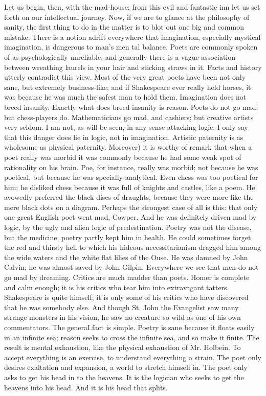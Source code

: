 \documentclass{book}
\begin{document}
Let us begin, then, with the mad-house; from this evil and fantastic inn let us set forth on our intellectual journey. Now, if we are to glance at the philosophy of sanity, the first thing to do in the matter is to blot out one big and common mistake. There is a notion adrift everywhere that imagination, especially mystical imagination, is dangerous to man’s men tal balance. Poets are commonly spoken of as psychologically unreliable; and generally there is a vague association between wreathing laurels in your hair and sticking straws in it. Facts and history utterly contradict this view. Most of the very great poets have been not only sane, but extremely business-like; and if Shakespeare ever really held horses, it was because he was much the safest man to hold them. Imagination does not breed insanity. Exactly what does breed insanity is reason. Poets do not go mad; but chess-players do. Mathematicians go mad, and cashiers; but creative artists very seldom. I am not, as will be seen, in any sense attacking logic: I only say that this danger does lie in logic, not in imagination. Artistic paternity is as wholesome as physical paternity. Moreover) it is worthy of remark that when a poet really was morbid it was commonly because he had some weak spot of rationality on his brain. Poe, for instance, really was morbid; not because he was poetical, but because he was specially analytical. Even chess was too poetical for him; he disliked chess because it was full of knights and castles, like a poem. He avowedly preferred the black discs of draughts, because they were more like the mere black dots on a diagram. Perhaps the strongest case of all is this: that only one great English poet went mad, Cowper. And he was definitely driven mad by logic, by the ugly and alien logic of predestination. Poetry was not the disease, but the medicine; poetry partly kept him in health. He could sometimes forget the red and thirsty hell to which his hideous necessitarianism dragged him among the wide waters and the white flat lilies of the Ouse. He was damned by John Calvin; he was almost saved by John Gilpin. Everywhere we see that men do not go mad by dreaming. Critics are much madder than poets. Homer is complete and calm enough; it is his critics who tear him into extravagant tatters. Shakespeare is quite himself; it is only some of his critics who have discovered that he was somebody else. And though St. John the Evangelist saw many strange monsters in his vision, he saw no creature so wild as one of his own commentators. The generaI.fact is simple. Poetry is sane because it floats easily in an infinite sea; reason seeks to cross the infinite sea, and so make it finite. The result is mental exhaustion, like the physical exhaustion of Mr. Holbein. To accept everything is an exercise, to understand everything a strain. The poet only desires exaltation and expansion, a world to stretch himself in. The poet only asks to get his head in to the heavens. It is the logician who seeks to get the heavens into his head. And it is his head that splits.
\end{document}
